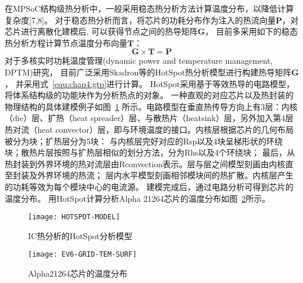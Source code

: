 在MPSoC结构级热分析中，一般采用稳态热分析方法计算温度分布，以降低计算复杂度[7,8]。 对于稳态热分析而言，将芯片的功耗分布作为注入的热流向量$\mathbf{P}$，对芯片进行离散化建模后, 可以获得节点之间的热导矩阵$\mathbf{G}$， 目前多采用如下的稳态热分析方程计算节点温度分布向量$\mathbf{T}$：
\begin{equation}
\label{equ:chap4:gtp}
\mathbf{G} \times \mathbf{T} = \mathbf{P}
\end{equation}
对于多核实时功耗温度管理(dynamic power and temperature management, DPTM)研究， 目前广泛采用Skadron等的HotSpot热分析模型进行构建热导矩阵$\mathbf{G}$， 并采用式~\ref{equ:chap4:gtp}进行计算。 HotSpot采用基于等效热导的电路模型，将体系结构级的功能块作为分析热点的对象。 一种直观的对应芯片以及热封装的物理结构的具体建模例子如图~\ref{fig:hotspot-model} 所示。电路模型在垂直热传导方向上有3层：内核（die）层、扩热（heat spreader）层、与散热片（heatsink）层，另外加入第4层热对流（heat convector）层，即与环境温度的接口。内核层根据芯片的几何布局被分为块；扩热层分为5块： 与内核层完好对应的Rsp以及4块呈梯形状的环绕块；散热片层按照与扩热层相似的划分方法，分为Rhs以及4个环绕块； 最后，从热封装到外界环境的热对流层由Rconvection表示。层与层之间模型刻画由内核直至封装及外界环境的热流； 层内水平模型刻画相邻模块间的热扩散。内核层产生的功耗等效为每个模块中心的电流源。 建模完成后，通过电路分析可得到芯片的温度分布。 用HotSpot计算分析Alpha 21264芯片的温度分布如图~\ref{fig:ev6-grid-temp-surf}所示。

\begin{figure}[H]
  \centering
  \texttt{[image: HOTSPOT-MODEL]}
  \caption{IC热分析的HotSpot分析模型}
  \label{fig:hotspot-model}
\end{figure}

\begin{figure}[H]
  \centering
  \texttt{[image: EV6-GRID-TEM-SURF]}
  \caption{Alpha21264芯片的温度分布}
  \label{fig:ev6-grid-temp-surf}
\end{figure}


